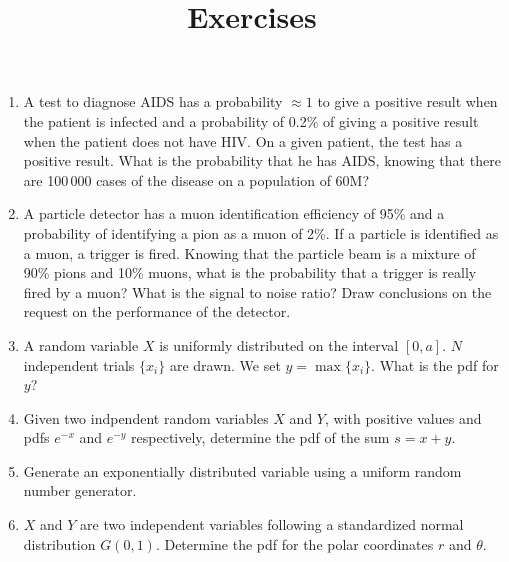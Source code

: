 \documentclass[a4paper,12pt]{article}
\title{Exercises}
\author{}
\date{}
\begin{document}
 \maketitle
 
 \begin{enumerate}
  \item A test to diagnose AIDS has a probability $\approx 1$ to give a positive result when the patient is infected and a probability of 0.2\% of giving a positive result when the patient
  does not have HIV. On a given patient, the test has a positive result. What is the probability that he has AIDS, knowing that there are 100\,000 cases of the disease on a population
  of 60M?
  \item A particle detector has a muon identification efficiency of 95\% and a probability of identifying a pion as a muon of 2\%. If a particle is identified as a muon, a trigger is
  fired. Knowing that the particle beam is a mixture of 90\% pions and 10\% muons, what is the probability that a trigger is really fired by a muon? What is the signal to noise ratio?
  Draw conclusions on the request on the performance of the detector.
  \item A random variable $X$ is uniformly distributed on the interval $[0,a]$. $N$ independent trials $\{x_i\}$ are drawn. We set $y = \max\{x_i\}$. What is the pdf for $y$?
  \item Given two indpendent random variables $X$ and $Y$, with positive values and pdfs $e^{-x}$ and $e^{-y}$ respectively, determine the pdf of the sum $s = x+y$.
  \item Generate an exponentially distributed variable using a uniform random number generator.
  \item $X$ and $Y$ are two independent variables following a standardized normal distribution $G(0,1)$. Determine the pdf for the polar coordinates $r$ and $\theta$.\\

\end{enumerate}
\end{document}

